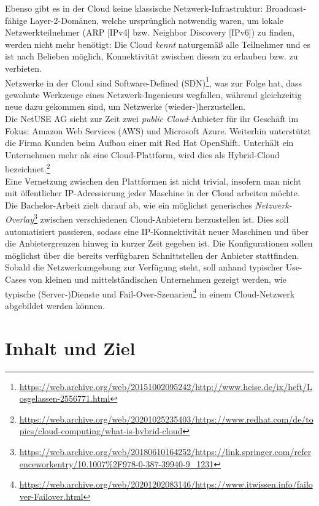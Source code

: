 Ebenso gibt es in der Cloud keine klassische Netzwerk-Infrastruktur: Broadcast-fähige Layer-2-Domänen, welche ursprünglich notwendig waren, um lokale Netzwerkteilnehmer (ARP [IPv4] bzw. Neighbor Discovery [IPv6]) zu finden, werden nicht mehr benötigt: Die Cloud \textit{kennt} naturgemäß alle Teilnehmer und es ist nach Belieben möglich, Konnektivität zwischen diesen zu erlauben bzw. zu verbieten.\\
Netzwerke in der Cloud sind Software-Defined (SDN)\footnote{\url{https://web.archive.org/web/20151002095242/http://www.heise.de/ix/heft/Losgelassen-2556771.html}}, was zur Folge hat, dass gewohnte Werkzeuge eines Netzwerk-Ingenieurs wegfallen, während gleichzeitig neue dazu gekommen sind, um Netzwerke (wieder-)herzustellen.\\
Die NetUSE AG sieht zur Zeit zwei \textit{public Cloud}-Anbieter für ihr Geschäft im Fokus: Amazon Web Services (AWS) und Microsoft Azure. Weiterhin unterstützt die Firma Kunden beim Aufbau einer \grqq{} mit Red Hat OpenShift. Unterhält ein Unternehmen mehr als eine Cloud-Plattform, wird dies als Hybrid-Cloud bezeichnet.\footnote{\url{https://web.archive.org/web/20201025235403/https://www.redhat.com/de/topics/cloud-computing/what-is-hybrid-cloud}}\\
Eine Vernetzung zwischen den Plattformen ist nicht trivial, insofern man nicht mit öffentlicher IP-Adressierung jeder Maschine in der Cloud arbeiten möchte.
Die Bachelor-Arbeit zielt darauf ab, wie ein möglichst generisches \textit{Netzwerk-Overlay}\footnote{\url{https://web.archive.org/web/20180610164252/https://link.springer.com/referenceworkentry/10.1007\%2F978-0-387-39940-9\_1231}} zwischen verschiedenen Cloud-Anbietern herzustellen ist. Dies soll automatisiert passieren, sodass eine IP-Konnektivität neuer Maschinen und \grqq{} über die Anbietergrenzen hinweg in kurzer Zeit gegeben ist. Die Konfigurationen sollen möglichst über die bereits verfügbaren Schnittstellen der Anbieter stattfinden. Sobald die Netzwerkumgebung zur Verfügung steht, soll anhand typischer Use-Cases von kleinen und mittelständischen Unternehmen gezeigt werden, wie typische (Server-)Dienste und Fail-Over-Szenarien\footnote{\url{https://web.archive.org/web/20201202083146/https://www.itwissen.info/failover-Failover.html}} in einem Cloud-Netzwerk abgebildet werden können.

\chapter{Inhalt und Ziel}
